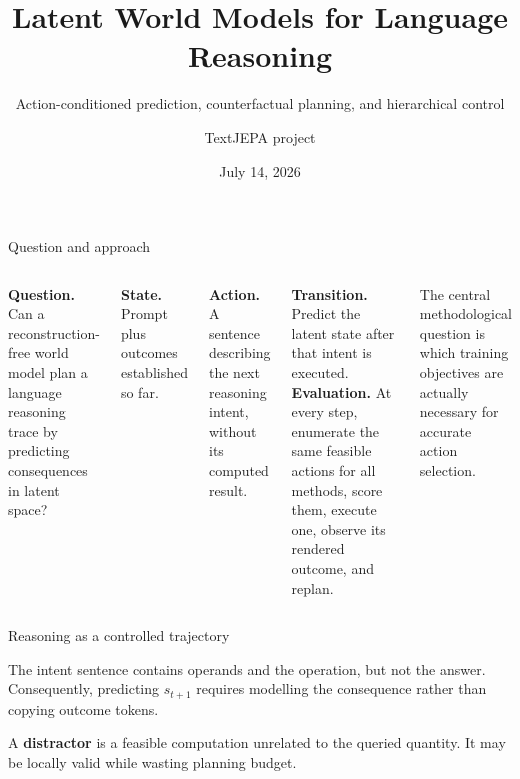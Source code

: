 \documentclass[aspectratio=169,10pt]{beamer}
\title{Latent World Models for Language Reasoning}
\subtitle{Action-conditioned prediction, counterfactual planning, and hierarchical control}
\author{TextJEPA project}
\date{July 14, 2026}
\begin{document}
\frame{\titlepage}

\begin{frame}{Question and approach}
\begin{columns}[T,onlytextwidth]
\textbf{Question.} Can a reconstruction-free world model plan a language
reasoning trace by predicting consequences in latent space?

\medskip
\textbf{State.} Prompt plus outcomes established so far.

\textbf{Action.} A sentence describing the next reasoning intent, without its
computed result.

\textbf{Transition.} Predict the latent state after that intent is executed.
\textbf{Evaluation.} At every step, enumerate the same feasible actions for
all methods, score them, execute one, observe its rendered outcome, and
replan.

\medskip
The central methodological question is which training objectives are
actually necessary for accurate action selection.
\end{columns}
\end{frame}

\begin{frame}{Reasoning as a controlled trajectory}
\small
\begin{center}
\end{center}

The intent sentence contains operands and the operation, but not the answer.
Consequently, predicting $s_{t+1}$ requires modelling the consequence rather
than copying outcome tokens.

\medskip
A \textbf{distractor} is a feasible computation unrelated to the queried
quantity. It may be locally valid while wasting planning budget.
\end{frame}
\end{document}
